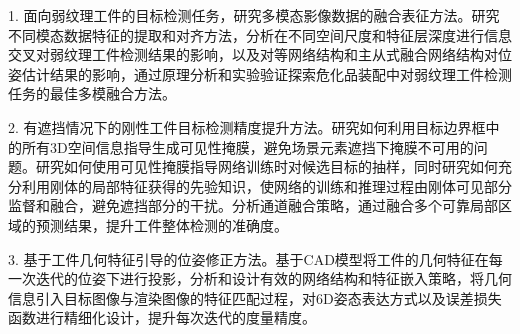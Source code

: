 \documentclass[12pt]{article}
\begin{document}
1. 面向弱纹理工件的目标检测任务，研究多模态影像数据的融合表征方法。研究不同模态数据特征的提取和对齐方法，分析在不同空间尺度和特征层深度进行信息交叉对弱纹理工件检测结果的影响，以及对等网络结构和主从式融合网络结构对位姿估计结果的影响，通过原理分析和实验验证探索危化品装配中对弱纹理工件检测任务的最佳多模融合方法。



2. 有遮挡情况下的刚性工件目标检测精度提升方法。研究如何利用目标边界框中的所有3D空间信息指导生成可见性掩膜，避免场景元素遮挡下掩膜不可用的问题。研究如何使用可见性掩膜指导网络训练时对候选目标的抽样，同时研究如何充分利用刚体的局部特征获得的先验知识，使网络的训练和推理过程由刚体可见部分监督和融合，避免遮挡部分的干扰。分析通道融合策略，通过融合多个可靠局部区域的预测结果，提升工件整体检测的准确度。




3. 基于工件几何特征引导的位姿修正方法。基于CAD模型将工件的几何特征在每一次迭代的位姿下进行投影，分析和设计有效的网络结构和特征嵌入策略，将几何信息引入目标图像与渲染图像的特征匹配过程，对6D姿态表达方式以及误差损失函数进行精细化设计，提升每次迭代的度量精度。
\end{document}
